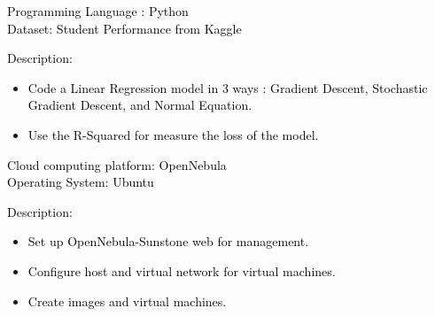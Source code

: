\documentclass[10pt,a4paper,ragged2e,withhyper]{altacv}
\begin{document}
\begin{paracol}{2}
            
            \divider
            \textcolor{black}{Programming Language : Python} \\
            \vspace{0.5em}
            \textcolor{black}{Dataset: Student Performance from Kaggle} \\
            \vspace{0.5em}
            
            \textcolor{black}{Description:} \\
            \vspace{0.5em}
            \begin{itemize}
                \item \textcolor{black}{Code a Linear Regression model in 3 ways : Gradient Descent, Stochastic Gradient Descent, and Normal Equation.}
                \item \textcolor{black}{Use the R-Squared for measure the loss of the model.}
            \end{itemize}
            \divider

            \textcolor{black}{Cloud computing platform: OpenNebula} \\
            \vspace{0.5em}
            \textcolor{black}{Operating System: Ubuntu} \\
            \vspace{0.5em}
            
            \textcolor{black}{Description:} \\
            \vspace{0.5em}
            \begin{itemize}
                \item \textcolor{black}{Set up OpenNebula-Sunstone web for management.}
                \item \textcolor{black}{Configure host and virtual network for virtual machines.}
                \item \textcolor{black}{Create images and virtual machines.}
            \end{itemize}
    \end{paracol}
\end{document}
